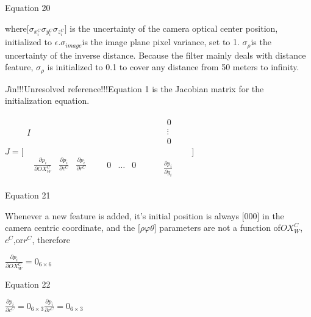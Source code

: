 Equation 20

where$[\sigma _{x_{i}^{C}}\sigma _{y_{i}^{C}}\sigma _{z_{i}^{C}}$$]$ 
is the uncertainty of the camera optical center position, initialized to 
$\epsilon $.$\sigma _{image}$is the image plane pixel variance, 
set to 1. $\sigma _{\rho }$is the uncertainty of the inverse 
distance. Because the filter mainly deals with distance feature, $
\sigma _{\rho }$ is initialized to 0.1 to cover any distance from 50 
meters to infinity. 

$J$in!!!Unresolved reference!!!Equation 1 is the Jacobian matrix for 
the initialization equation. 

$J=\lbrack \begin{matrix}
I & \begin{matrix}
0 & \\
\vdots & \\
0 & \\
\end{matrix}
 & \\
\begin{matrix}
\begin{matrix}
\frac{\partial p_{i}}{\partial OX_{W}^{C}} & \frac{\partial 
p_{i}}{\partial c^{C}} & \frac{\partial p_{i}}{\partial r^{C}} & \\
\end{matrix}
 & \begin{matrix}
0 & \ldots & 0 & \\
\end{matrix}
 & \\
\end{matrix}
 & \frac{\partial p_{i}}{\partial g_{i}} & \\
\end{matrix}
\rbrack $\\


Equation 21

Whenever a new feature is added, it's initial position is always $
\lbrack 0 0 0\rbrack $ in the camera centric coordinate, and the $
\lbrack \rho \varphi \theta \rbrack $ parameters are not a function of$
OX_{W}^{C}$, $c^{C}$,or$r^{C}$, therefore

$\frac{\partial p_{i}}{\partial OX_{W}^{C}}=0_{6\times 6}$\\


\begin{center}Equation 22\end{center}

$\frac{\partial p_{i}}{\partial c^{C}}=0_{6\times 3}\frac{\partial 
p_{i}}{\partial r^{C}}= 0_{6\times 3}$\\


